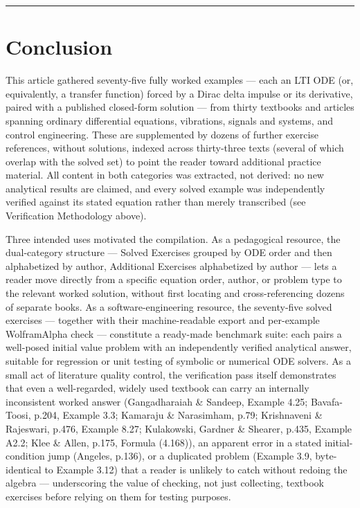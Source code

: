 \documentclass[
  11pt,
]{article}
\begin{document}
\begin{center}\rule{0.5\linewidth}{0.5pt}\end{center}

\hypertarget{conclusion}{%
\section{Conclusion}\label{conclusion}}

This article gathered seventy-five fully worked examples --- each an LTI
ODE (or, equivalently, a transfer function) forced by a Dirac delta
impulse or its derivative, paired with a published closed-form solution
--- from thirty textbooks and articles spanning ordinary differential
equations, vibrations, signals and systems, and control engineering.
These are supplemented by dozens of further exercise references, without
solutions, indexed across thirty-three texts (several of which overlap
with the solved set) to point the reader toward additional practice
material. All content in both categories was extracted, not derived: no
new analytical results are claimed, and every solved example was
independently verified against its stated equation rather than merely
transcribed (see Verification Methodology above).

Three intended uses motivated the compilation. As a pedagogical
resource, the dual-category structure --- Solved Exercises grouped by
ODE order and then alphabetized by author, Additional Exercises
alphabetized by author --- lets a reader move directly from a specific
equation order, author, or problem type to the relevant worked solution,
without first locating and cross-referencing dozens of separate books.
As a software-engineering resource, the seventy-five solved exercises
--- together with their machine-readable export and per-example
WolframAlpha check --- constitute a ready-made benchmark suite: each
pairs a well-posed initial value problem with an independently verified
analytical answer, suitable for regression or unit testing of symbolic
or numerical ODE solvers. As a small act of literature quality control,
the verification pass itself demonstrates that even a well-regarded,
widely used textbook can carry an internally inconsistent worked answer
(Gangadharaiah \& Sandeep, Example 4.25; Bavafa-Toosi, p.204, Example
3.3; Kamaraju \& Narasimham, p.79; Krishnaveni \& Rajeswari, p.476,
Example 8.27; Kulakowski, Gardner \& Shearer, p.435, Example A2.2; Klee
\& Allen, p.175, Formula (4.168)), an apparent error in a stated
initial-condition jump (Angeles, p.136), or a duplicated problem
(Example 3.9, byte-identical to Example 3.12) that a reader is unlikely
to catch without redoing the algebra --- underscoring the value of
checking, not just collecting, textbook exercises before relying on them
for testing purposes.
\end{document}
